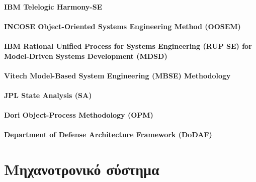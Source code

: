 \documentclass[a4paper,12pt,twoside]{report}
\begin{document}
{%
			\subsubsection{IBM Telelogic Harmony-SE}
			\subsubsection{INCOSE Object-Oriented Systems Engineering Method (OOSEM)}
			\subsubsection{IBM Rational Unified Process for Systems Engineering (RUP SE) for Model-Driven Systems Development (MDSD)}
			\subsubsection{Vitech Model-Based System Engineering (MBSE) Methodology}
			\subsubsection{JPL State Analysis (SA)}
			\subsubsection{Dori Object-Process Methodology (OPM)}
			\subsubsection{Department of Defense Architecture Framework (DoDAF)}


	\chapter{Μηχανοτρονικό σύστημα}
		\label{κεφ.:Μηχανοτρονικό σύστημα}

}
\end{document}
